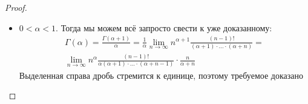 \begin{proof}
\begin{itemize}
		\item $0 < \alpha < 1$. Тогда мы можем всё запросто свести к уже доказанному:
		\begin{multline*}
			\Gamma(\alpha) = \frac{\Gamma(\alpha + 1)}{\alpha} = \frac{1}{\alpha} \lim_{n \to \infty} n^{\alpha + 1} \frac{(n - 1)!}{(\alpha + 1) \cdot \ldots \cdot (\alpha + n)} =
			\\
			\lim_{n \to \infty} n^\alpha \frac{(n - 1)!}{\alpha(\alpha + 1) \cdot \ldots \cdot (\alpha + n - 1)} \cdot \frac{n}{\alpha + n}
		\end{multline*}
		Выделенная справа дробь стремится к единице, поэтому требуемое доказано
	\end{itemize}
\end{proof}